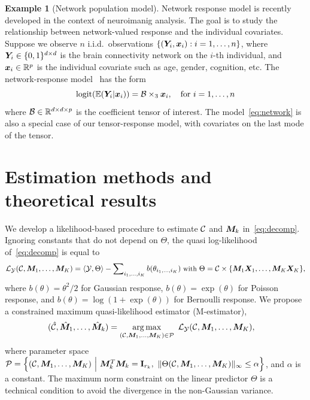\documentclass{article}
\theoremstyle{definition}
\theoremstyle{definition}
\newtheorem{example}{Example}
\begin{document}
\begin{example}[Network population model] 
Network response model is recently developed in the context of neuroimanig analysis. The goal is to study the relationship between network-valued response and the individual covariates. Suppose we observe $n$ i.i.d.\ observations $\{(\bm Y_i, \bm x_i): i=1,\ldots,n\}$, where $\bm Y_i\in\{0,1\}^{d\times d}$ is the brain connectivity network on the $i$-th individual, and $\bm x_i\in\mathbb{R}^p$ is the individual covariate such as age, gender, cognition, etc. The network-response model~\citep{rabusseau2016low} has the form
\begin{equation}\label{eq:network}
\text{logit}(\mathbb{E}(\bm Y_i|\bm x_i))=\mathcal{B}\times_3\bm x_i, \quad \text{for }i=1,\ldots,n
\end{equation}
where $\mathcal{B}\in \mathbb{R}^{d\times d\times p}$ is the coefficient tensor of interest. The model~\eqref{eq:network} is also a special case of our tensor-response model, with covariates on the last mode of the tensor. 
\end{example}

\vspace{-0.2cm}

\section{Estimation methods and theoretical results}

\vspace{-0.2cm}
We develop a likelihood-based procedure to estimate $\mathcal{C}$ and $\bm M_k$ in~\eqref{eq:decomp}. Ignoring constants that do not depend on $\Theta$, the quasi log-likelihood of~\eqref{eq:decomp} is equal to
\begin{equation}\label{eq:loglikelihood}
\small
\tL_{\tY}(\tC,\mM_1,\ldots,\mM_K)=\langle \tY, \Theta \rangle - \sum\nolimits_{i_1,\ldots,i_K} b(\theta_{i_1,\ldots,i_K})\ \text{with}\ \Theta=\tC\times\{\mM_1\mX_1,\ldots,\mM_K\mX_K\},
\end{equation}
where $b(\theta)=\theta^2/2$ for Gaussian response, $b(\theta)=\exp(\theta)$ for Poisson response, and $b(\theta)=\log(1+\exp(\theta))$ for Bernoulli response. We propose a constrained maximum quasi-likelihood estimator (M-estimator),
\begin{align} \label{eq:MLE} 
(\hat \tC, \hat \mM_1,\ldots,\hat \mM_k) &=\argmax_{(\tC,\mM_1,\ldots,\mM_K)\in \tP} \ \tL_{\tY}(\tC,\mM_1,\ldots,\mM_K),
\end{align}
where parameter space 
$
\tP=\left\{(\tC, \mM_1,\ldots,\mM_K) \ \Big| \ \mM_k^T\mM_k=\mathbf{I}_{r_k},\ \mnormSize{}{\Theta(\tC,\mM_1,\ldots,\mM_K)}\leq \alpha \right\}
$, and $\alpha$ is a constant. The maximum norm constraint on the linear predictor $\Theta$ is a technical condition to avoid the divergence in the non-Gaussian variance.
\end{document}
